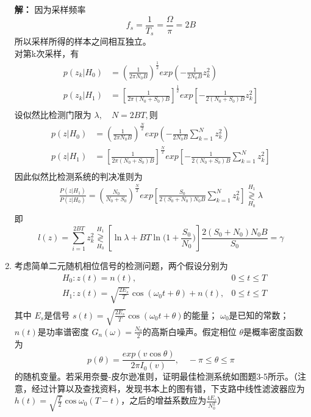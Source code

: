 \documentclass{article}
\begin{document}
\begin{enumerate}[1.]
\textbf{解：}
因为采样频率 \[
	f_s = \frac{1}{T_s}=\frac{\Omega}{\pi}=2B
\]
所以采样所得的样本之间相互独立。\\
对第k次采样，有 \[
	\begin{aligned}
	p(z_k|H_0)&=\left(\frac{1}{2\pi N_0B}\right)^{\frac{1}{2}}exp\left( -\frac{1}{2N_0B}z_k^2 \right)\\
	p(z_k|H_1)&=\left[\frac{1}{2\pi (N_0+S_0)B}\right]^{\frac{1}{2}}exp\left[ -\frac{1}{2(N_0+S_0)B}z_k^2 \right]\\
	\end{aligned}
\]
设似然比检测门限为 $ \lambda ,\quad N=2BT,$则 \[
	\begin{aligned}
	p(z|H_0)&=\left(\frac{1}{2\pi N_0B}\right)^{\frac{N}{2}}exp\left( -\frac{1}{2N_0B}\sum_{k=1}^{N}z_k^2 \right)\\
	p(z|H_1)&=\left[\frac{1}{2\pi (N_0+S_0)B}\right]^{\frac{N}{2}}exp\left[ -\frac{1}{2(N_0+S_0)B}\sum_{k=1}^{N}z_k^2 \right]\\
	\end{aligned}
\]
因此似然比检测系统的判决准则为 \[
	\begin{aligned}
	\frac{P(z|H_1)}{P(z|H_0)}=\left(\frac{N_0}{N_0+S_0}\right)^{\frac{N}{2}}exp\left[\frac{S_0}{2(S_0+N_0)N_0B}\sum_{k=1}^{N}z_k^2\right]\mathop{\gtrless}\limits_{H_0}^{H_1} \lambda\\
	\end{aligned}
\]
即 \[
	l(z)=\sum_{i=1}^{2BT}z_k^2 \mathop{\gtrless}\limits ^{H_1}_{H_0} \left[\ln \lambda+BT\ln {(1+\frac{S_0}{N_0}})\right]\frac{2(S_0+N_0)N_0B}{S_0}=\gamma
\]
\item
考虑简单二元随机相位信号的检测问题，两个假设分别为\[
	\begin{aligned}
	&H_0:z(t)=n(t),& 0\le t\le T\\
	&H_1:z(t)=\sqrt{\frac{2E_s}{T}}\cos(\omega_0t+\theta)+n(t),&0\le t\le T\\
	\end{aligned}
\]
其中 $ E_s $是信号 $ s(t) =  \sqrt{\frac{2E_s}{T}}\cos(\omega_0t+\theta) $的能量； $ \omega_0 $是已知的常数； $ n(t) $是功率谱密度 $ G_n(\omega)=\frac{N_0}{2} $的高斯白噪声。假定相位 $ \theta $是概率密度函数为 \[
	p(\theta) = \frac{exp(v\cos \theta)}{2\pi I_0(v)},\quad -\pi\le \theta \le \pi
\]
的随机变量。若采用奈曼-皮尔逊准则，证明最佳检测系统如图题3-5所示。（注意，经过计算以及查找资料，发现书本上的图有错，下支路中线性滤波器应为 $ h(t)=\sqrt{\frac{T}{2}}\cos\omega_0(T-t) $，之后的增益系数应为$\frac{4E_s}{N_0^2}$）


\end{enumerate}
\end{document}
